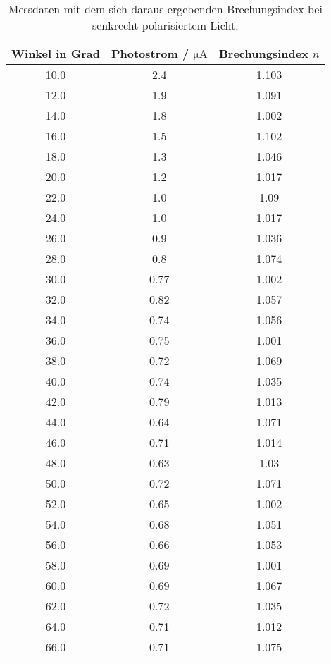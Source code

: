 \begin{table}[H]
    \centering
    \caption{Messdaten mit dem sich daraus ergebenden Brechungsindex bei senkrecht polarisiertem Licht.}
    \label{tab:ppolMess}
    \begin{tabular}{c c c}
        \toprule
        Winkel in Grad & Photostrom / $\si{\micro\ampere}$  & Brechungsindex $n$ \\
        \midrule
        10.0  &  2.4  &  1.103  \\
        12.0  &  1.9  &  1.091  \\
        14.0  &  1.8  &  1.002  \\
        16.0  &  1.5  &  1.102  \\
        18.0  &  1.3  &  1.046  \\
        20.0  &  1.2  &  1.017  \\
        22.0  &  1.0  &  1.09  \\
        24.0  &  1.0  &  1.017  \\
        26.0  &  0.9  &  1.036  \\
        28.0  &  0.8  &  1.074  \\
        30.0  &  0.77  &  1.002  \\
        32.0  &  0.82  &  1.057  \\
        34.0  &  0.74  &  1.056  \\
        36.0  &  0.75  &  1.001  \\
        38.0  &  0.72  &  1.069  \\
        40.0  &  0.74  &  1.035  \\
        42.0  &  0.79  &  1.013  \\
        44.0  &  0.64  &  1.071  \\
        46.0  &  0.71  &  1.014  \\
        48.0  &  0.63  &  1.03  \\
        50.0  &  0.72  &  1.071  \\
        52.0  &  0.65  &  1.002  \\
        54.0  &  0.68  &  1.051  \\
        56.0  &  0.66  &  1.053  \\
        58.0  &  0.69  &  1.001  \\
        60.0  &  0.69  &  1.067  \\
        62.0  &  0.72  &  1.035  \\
        64.0  &  0.71  &  1.012  \\
        66.0  &  0.71  &  1.075  \\

\end{tabular}
\end{table}
